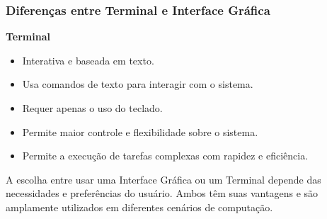 \documentclass{beamer}
\begin{document}
      
            \begin{frame}\justifying
                  \frametitle{Diferenças entre Terminal e Interface Gráfica}
                           
            \textbf{Terminal}
            \begin{itemize}
                \item Interativa e baseada em texto.
                \item Usa comandos de texto para interagir com o sistema.
                \item Requer apenas o uso do teclado.
                \item Permite maior controle e flexibilidade sobre o sistema.
                \item Permite a execução de tarefas complexas com rapidez e eficiência.
            \end{itemize}
            
            A escolha entre usar uma Interface Gráfica ou um Terminal depende das necessidades e preferências do usuário. Ambos têm suas vantagens e são amplamente utilizados em diferentes cenários de computação.
            \end{frame}
\end{document}
